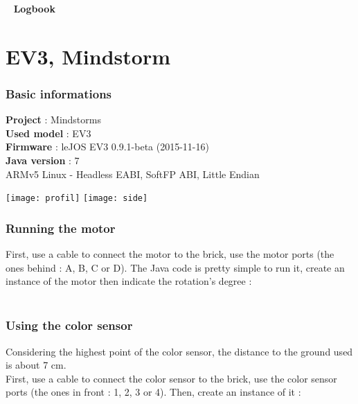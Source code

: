 \documentclass[a4paper, 12pt]{article}
\begin{document}
~
\vfill
\textbf{\Huge{Logbook}}
\vfill

\renewcommand{\contentsname}{Table of contents}
\newpage
\chapter{EV3, Mindstorm}
\tableofcontents
\newpage

\subsection{Basic informations}

\textbf{Project} : Mindstorms\\
\textbf{Used model} : EV3\\
\textbf{Firmware} : leJOS EV3 0.9.1-beta (2015-11-16)\\
\textbf{Java version} : 7\\
ARMv5 Linux - Headless EABI, SoftFP ABI, Little Endian\\
\begin{center}
\texttt{[image: profil]} \hspace{0.5cm} \texttt{[image: side]}
\end{center}

\newpage
\subsection{Running the motor}

First, use a cable to connect the motor to the brick, use the motor ports (the ones behind : A, B, C or D). The Java code is pretty simple to run it, create an instance of the motor then indicate the rotation's degree :
\\ \\

\subsection{Using the color sensor}

Considering the highest point of the color sensor, the distance to the ground used is about 7 cm.\\
First, use a cable to connect the color sensor to the brick, use the color sensor ports (the ones in front : 1, 2, 3 or 4). Then, create an instance of it :
\\ \\
\end{document}
